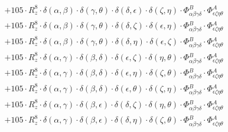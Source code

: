 \documentclass{article}
\begin{document}
\begin{equation}
\begin{array}{c}
 \\[0.2em] 		 + 105 \cdot R_{z}^{8} \cdot \delta{}\left(\alpha{}, \beta{}\right) \cdot \delta{}\left(\gamma{}, \theta{}\right) \cdot \delta{}\left(\delta{}, \epsilon{}\right) \cdot \delta{}\left(\zeta{}, \eta{}\right) \cdot \Phi{}^{B}_{\alpha{}\beta{}\gamma{}\delta{}} \cdot \Phi{}^{A}_{\epsilon{}\zeta{}\eta{}\theta{}} 
 \\[0.2em] 		 + 105 \cdot R_{z}^{8} \cdot \delta{}\left(\alpha{}, \beta{}\right) \cdot \delta{}\left(\gamma{}, \theta{}\right) \cdot \delta{}\left(\delta{}, \zeta{}\right) \cdot \delta{}\left(\epsilon{}, \eta{}\right) \cdot \Phi{}^{B}_{\alpha{}\beta{}\gamma{}\delta{}} \cdot \Phi{}^{A}_{\epsilon{}\zeta{}\eta{}\theta{}} 
 \\[0.2em] 		 + 105 \cdot R_{z}^{8} \cdot \delta{}\left(\alpha{}, \beta{}\right) \cdot \delta{}\left(\gamma{}, \theta{}\right) \cdot \delta{}\left(\delta{}, \eta{}\right) \cdot \delta{}\left(\epsilon{}, \zeta{}\right) \cdot \Phi{}^{B}_{\alpha{}\beta{}\gamma{}\delta{}} \cdot \Phi{}^{A}_{\epsilon{}\zeta{}\eta{}\theta{}} 
 \\[0.2em] 		 + 105 \cdot R_{z}^{8} \cdot \delta{}\left(\alpha{}, \gamma{}\right) \cdot \delta{}\left(\beta{}, \delta{}\right) \cdot \delta{}\left(\epsilon{}, \zeta{}\right) \cdot \delta{}\left(\eta{}, \theta{}\right) \cdot \Phi{}^{B}_{\alpha{}\beta{}\gamma{}\delta{}} \cdot \Phi{}^{A}_{\epsilon{}\zeta{}\eta{}\theta{}} 
 \\[0.2em] 		 + 105 \cdot R_{z}^{8} \cdot \delta{}\left(\alpha{}, \gamma{}\right) \cdot \delta{}\left(\beta{}, \delta{}\right) \cdot \delta{}\left(\epsilon{}, \eta{}\right) \cdot \delta{}\left(\zeta{}, \theta{}\right) \cdot \Phi{}^{B}_{\alpha{}\beta{}\gamma{}\delta{}} \cdot \Phi{}^{A}_{\epsilon{}\zeta{}\eta{}\theta{}} 
 \\[0.2em] 		 + 105 \cdot R_{z}^{8} \cdot \delta{}\left(\alpha{}, \gamma{}\right) \cdot \delta{}\left(\beta{}, \delta{}\right) \cdot \delta{}\left(\epsilon{}, \theta{}\right) \cdot \delta{}\left(\zeta{}, \eta{}\right) \cdot \Phi{}^{B}_{\alpha{}\beta{}\gamma{}\delta{}} \cdot \Phi{}^{A}_{\epsilon{}\zeta{}\eta{}\theta{}} 
 \\[0.2em] 		 + 105 \cdot R_{z}^{8} \cdot \delta{}\left(\alpha{}, \gamma{}\right) \cdot \delta{}\left(\beta{}, \epsilon{}\right) \cdot \delta{}\left(\delta{}, \zeta{}\right) \cdot \delta{}\left(\eta{}, \theta{}\right) \cdot \Phi{}^{B}_{\alpha{}\beta{}\gamma{}\delta{}} \cdot \Phi{}^{A}_{\epsilon{}\zeta{}\eta{}\theta{}} 
 \\[0.2em] 		 + 105 \cdot R_{z}^{8} \cdot \delta{}\left(\alpha{}, \gamma{}\right) \cdot \delta{}\left(\beta{}, \epsilon{}\right) \cdot \delta{}\left(\delta{}, \eta{}\right) \cdot \delta{}\left(\zeta{}, \theta{}\right) \cdot \Phi{}^{B}_{\alpha{}\beta{}\gamma{}\delta{}} \cdot \Phi{}^{A}_{\epsilon{}\zeta{}\eta{}\theta{}} 

\end{array}
\end{equation}
\end{document}

